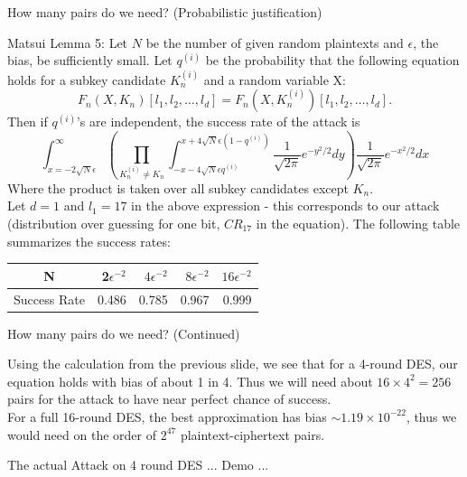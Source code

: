 \documentclass[9pt]{beamer}
\begin{document}
\begin{frame}
How many pairs do we need? (Probabilistic justification)

\vspace{3mm}
Matsui Lemma 5: Let $N$ be the number of given random plaintexts and $\epsilon$, the bias, be sufficiently small. Let $q^{(i)}$ be the probability that the following equation holds for a subkey candidate $K_n^{(i)}$ and a random variable X:
\[ F_n(X,K_n)[l_1, l_2,\dots,l_d] = F_n(X, K_n^{(i)})[l_1, l_2, \dots, l_d].\]
Then if $q^{(i)}$'s are independent, the success rate of the attack is
\[ \int_{x=-2\sqrt{N}\epsilon}^\infty \left( \prod_{K_n^{(i)} \neq K_n} \int_{-x-4\sqrt{N}\epsilon q^{(i)}}^{x+4\sqrt{N}\epsilon (1 - q^{(i)})} \frac{1}{\sqrt{2\pi}} e^{-y^2/2} dy \right) \frac{1}{\sqrt{2\pi}} e^{-x^2/2} dx \]
Where the product is taken over all subkey candidates except $K_n$.\\
\vspace{3mm}
Let $d = 1$ and $l_1 = 17$ in the above expression - this corresponds to our attack (distribution over guessing for one bit, $CR_{17}$ in the equation). The following table summarizes the success rates:
\begin{center}
\begin{tabular}{|c|r|r|r|r|}
\hline
N & 2$\epsilon^{-2}$ & $4\epsilon^{-2}$ & $8\epsilon^{-2}$ & $16\epsilon^{-2}$ \\
\hline
Success Rate & 0.486 & 0.785 & 0.967 & 0.999 \\
\hline
\end{tabular} 
\end{center}
\end{frame}

\begin{frame}
How many pairs do we need? (Continued)

\vspace{3mm}
Using the calculation from the previous slide, we see that for a 4-round DES, our equation holds with bias of about 1 in 4. Thus we will need about $16\times 4^2 = 256$ pairs for the attack to have near perfect chance of success.\\
\vspace{3mm}
For a full 16-round DES, the best approximation has bias $\sim 1.19\times 10^{-22}$, thus we would need on the order of $2^{47}$ plaintext-ciphertext pairs.
\end{frame}

\begin{frame}
The actual Attack on 4 round DES ... Demo ...
\end{frame}
\end{document}
